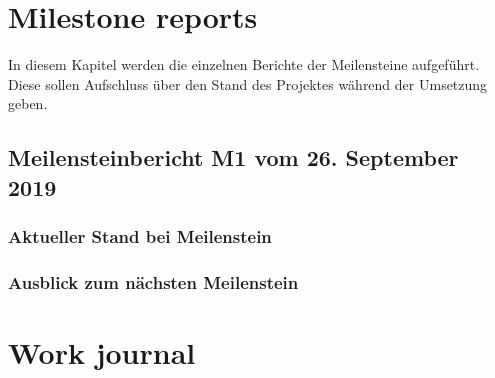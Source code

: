 \chapter{Milestone reports}
\label{app:Milestone-Reports}
In diesem Kapitel werden die einzelnen Berichte der Meilensteine aufgeführt. Diese sollen Aufschluss über den Stand des
Projektes während der Umsetzung geben.

\section{Meilensteinbericht M1 vom 26. September 2019}

\subsection{Aktueller Stand bei Meilenstein}

\subsection{Ausblick zum nächsten Meilenstein}

\chapter{Work journal}
\label{ch:Work-Journal}

\landscapevalues
\clearpage


